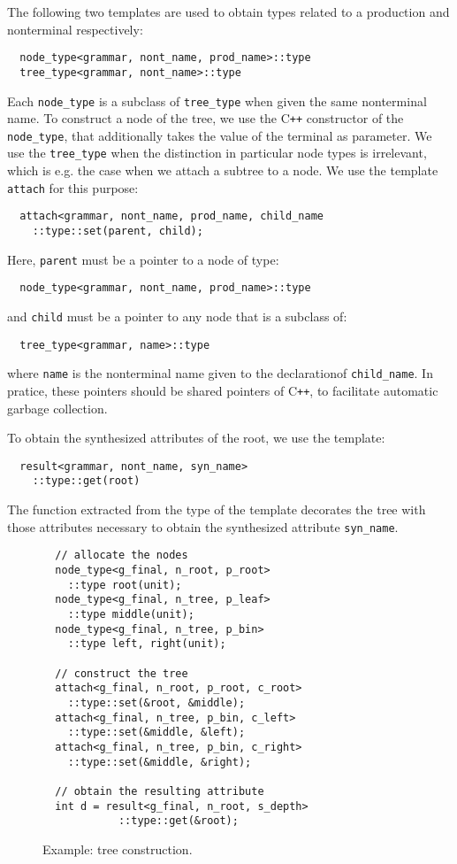 \documentclass{llncs}
\newcommand*{\Cpp}{C\texttt{++}}
\begin{document}
  The following two templates are used to obtain
  types related to a production and nonterminal
  respectively:
  \begin{lstlisting}
  node_type<grammar, nont_name, prod_name>::type
  tree_type<grammar, nont_name>::type
  \end{lstlisting}
  Each \lstinline$node_type$ is a subclass of
  \lstinline$tree_type$ when given the same
  nonterminal name. To construct a node of the
  tree, we use the \Cpp{} constructor of the
  \lstinline$node_type$, that additionally
  takes the value of the terminal as parameter. 
  We use the \lstinline$tree_type$ when the
  distinction in particular node types is
  irrelevant, which is e.g. the case when
  we attach a subtree to a node. We use the
  template \lstinline$attach$ for
  this purpose:
  \begin{lstlisting}
  attach<grammar, nont_name, prod_name, child_name
    ::type::set(parent, child);
  \end{lstlisting}
  Here, \lstinline$parent$ must be a pointer to
  a node of type:
  \begin{lstlisting}
  node_type<grammar, nont_name, prod_name>::type
  \end{lstlisting}
  and \lstinline$child$ must be a pointer to
  any node that is a subclass of:
  \begin{lstlisting}
  tree_type<grammar, name>::type
  \end{lstlisting}
  where \lstinline$name$ is the nonterminal name
  given to the declarationof \lstinline$child_name$.
  In pratice, these pointers should be shared pointers
  of \Cpp, to facilitate automatic garbage collection.
  
  To obtain the synthesized attributes of the root,
  we use the template: 
  \begin{lstlisting}
  result<grammar, nont_name, syn_name>
    ::type::get(root)
  \end{lstlisting}
  The function extracted from the type of the template
  decorates the tree with those attributes necessary to obtain the
  synthesized attribute \lstinline$syn_name$.
  
  \begin{figure}[ht]
  \begin{lstlisting}
  // allocate the nodes
  node_type<g_final, n_root, p_root>
    ::type root(unit);
  node_type<g_final, n_tree, p_leaf>
    ::type middle(unit);
  node_type<g_final, n_tree, p_bin>
    ::type left, right(unit);

  // construct the tree
  attach<g_final, n_root, p_root, c_root>
    ::type::set(&root, &middle);
  attach<g_final, n_tree, p_bin, c_left>
    ::type::set(&middle, &left);
  attach<g_final, n_tree, p_bin, c_right>
    ::type::set(&middle, &right);

  // obtain the resulting attribute
  int d = result<g_final, n_root, s_depth>
            ::type::get(&root);
  \end{lstlisting}
  \caption{Example: tree construction.}
  \label{fig:example:construct}
  \end{figure}
\end{document}
